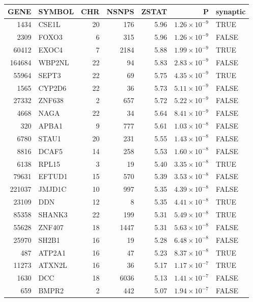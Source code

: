 \begin{table}[ht]
\centering
\begin{tabular}{rlrrrrl}
  \hline
GENE & SYMBOL & CHR & NSNPS & ZSTAT & P & synaptic \\ 
  \hline
1434 & CSE1L &  20 & 176 & 5.96 & $1.26 \times 10^{-9}$ & TRUE \\ 
  2309 & FOXO3 &   6 & 315 & 5.96 & $1.26 \times 10^{-9}$ & FALSE \\ 
  60412 & EXOC4 &   7 & 2184 & 5.88 & $1.99 \times 10^{-9}$ & TRUE \\ 
  164684 & WBP2NL &  22 &  94 & 5.83 & $2.83 \times 10^{-9}$ & FALSE \\ 
  55964 & SEPT3 &  22 &  69 & 5.75 & $4.35 \times 10^{-9}$ & TRUE \\ 
  1565 & CYP2D6 &  22 &  36 & 5.73 & $5.11 \times 10^{-9}$ & FALSE \\ 
  27332 & ZNF638 &   2 & 657 & 5.72 & $5.22 \times 10^{-9}$ & FALSE \\ 
  4668 & NAGA &  22 &  34 & 5.64 & $8.41 \times 10^{-9}$ & FALSE \\ 
  320 & APBA1 &   9 & 777 & 5.61 & $1.03 \times 10^{-8}$ & FALSE \\ 
  6780 & STAU1 &  20 & 231 & 5.55 & $1.43 \times 10^{-8}$ & FALSE \\ 
  8816 & DCAF5 &  14 & 258 & 5.53 & $1.60 \times 10^{-8}$ & FALSE \\ 
  6138 & RPL15 &   3 &  19 & 5.40 & $3.35 \times 10^{-8}$ & TRUE \\ 
  79631 & EFTUD1 &  15 & 570 & 5.39 & $3.53 \times 10^{-8}$ & FALSE \\ 
  221037 & JMJD1C &  10 & 997 & 5.35 & $4.39 \times 10^{-8}$ & FALSE \\ 
  23109 & DDN &  12 &   8 & 5.35 & $4.41 \times 10^{-8}$ & TRUE \\ 
  85358 & SHANK3 &  22 & 199 & 5.31 & $5.49 \times 10^{-8}$ & TRUE \\ 
  55628 & ZNF407 &  18 & 1447 & 5.31 & $5.63 \times 10^{-8}$ & FALSE \\ 
  25970 & SH2B1 &  16 &  19 & 5.28 & $6.48 \times 10^{-8}$ & FALSE \\ 
  487 & ATP2A1 &  16 &  47 & 5.23 & $8.37 \times 10^{-8}$ & TRUE \\ 
  11273 & ATXN2L &  16 &  36 & 5.17 & $1.17 \times 10^{-7}$ & TRUE \\ 
  1630 & DCC &  18 & 6036 & 5.13 & $1.41 \times 10^{-7}$ & FALSE \\ 
  659 & BMPR2 &   2 & 442 & 5.07 & $1.94 \times 10^{-7}$ & FALSE \\ 

\end{tabular}
\end{table}
